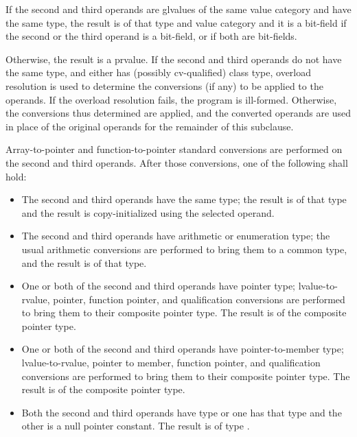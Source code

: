 \pnum
If the second and third operands are glvalues of the same value category
and have the same type, the
result is of that type and value category and it is a bit-field if the
second or the third operand is a bit-field, or if both are bit-fields.

\pnum
Otherwise, the result is a prvalue. If the second and third operands do
not have the same type, and either has (possibly cv-qualified) class
type, overload resolution is used to determine the conversions (if any)
to be applied to the operands.
If the overload resolution fails, the program is ill-formed. Otherwise,
the conversions thus determined are applied, and the converted operands
are used in place of the original operands for the remainder of this
subclause.

\pnum
Array-to-pointer
and function-to-pointer standard conversions are
performed on the second and third operands. After those conversions, one
of the following shall hold:

\begin{itemize}
\item The second and third operands have the same type; the result is of
that type and the result is copy-initialized using the selected operand.

\item The second and third operands have arithmetic or enumeration type;
the usual arithmetic conversions are performed to bring them to a common
type, and the result is of that type.

\item One or both of the second and third operands have pointer type;
lvalue-to-rvalue,
pointer,
function pointer, and
qualification conversions
are performed to bring them to their
composite pointer type. The result is of the composite
pointer type.

\item One or both of the second and third operands have pointer-to-member type;
lvalue-to-rvalue,
pointer to member,
function pointer, and
qualification conversions
are performed to bring them to their composite
pointer type. The result is of the composite pointer type.

\item
Both the second and third operands have type  or one has
that type and the other is a null pointer constant. The result is of type
.

\end{itemize}


